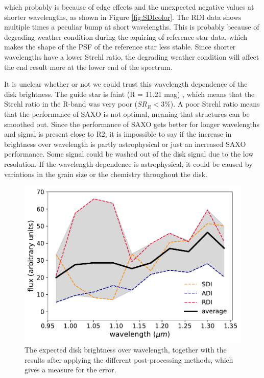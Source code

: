 \documentclass[twoside,single,12pt]{lion-msc}
\begin{document}
\noindent
which probably is because of edge effects and the unexpected negative values at shorter wavelengths, as shown in Figure \ref{fig:SDIcolor}. The RDI data shows multiple times a peculiar bump at short wavelengths. This is probably because of degrading weather condition during the aquiring of reference star data, which makes the shape of the PSF of the reference star less stable. Since shorter wavelengths have a lower Strehl ratio, the degrading weather condition will affect the end result more at the lower end of the spectrum.
\bigskip

It is unclear whether or not we could trust this wavelength dependence of the disk brightness. The guide star is faint (R = 11.21 mag) \citep{Makarov2007}, which means that the Strehl ratio in the R-band was very poor ($SR_R < 3$\%\citep{DeBoer2016}). A poor Strehl ratio means that the performance of SAXO is not optimal, meaning that structures can be smoothed out. Since the performance of SAXO gets better for longer wavelengths and signal is present close to R2, it is impossible to say if the increase in brightness over wavelength is partly astrophysical or just an increased SAXO performance. Some signal could be washed out of the disk signal due to the low resolution. If the wavelength dependence is astrophysical, it could be caused by variations in the grain size or the chemistry throughout the disk. %
\bigskip

\begin{figure}
\vspace{-6mm}
\centering
\includegraphics[width=1\linewidth]{totflux}
\caption{The expected disk brightness over wavelength, together with the results after applying the different post-processing methods, which gives a measure for the error.}
\label{fig:totflux}
\vspace{-4mm}
\end{figure}
\end{document}
